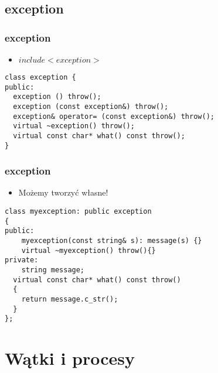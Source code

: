 \documentclass[10pt]{beamer}
\begin{document}
\subsection{exception}

\begin{frame}[fragile]
  \frametitle{exception}
  
\begin{itemize}
	\item $include <exception>$
\end{itemize}  
  
\begin{lstlisting}
class exception {
public:
  exception () throw();
  exception (const exception&) throw();
  exception& operator= (const exception&) throw();
  virtual ~exception() throw();
  virtual const char* what() const throw();
}
\end{lstlisting}
\end{frame}

\begin{frame}[fragile]
  \frametitle{exception}
\begin{itemize}
	\item Możemy tworzyć własne!
\end{itemize}  
  
\begin{lstlisting}
class myexception: public exception
{
public:
	myexception(const string& s): message(s) {}
	virtual ~myexception() throw(){}
private:
	string message;
  virtual const char* what() const throw()
  {
    return message.c_str();
  }
};
\end{lstlisting}

\end{frame}

\section{Wątki i procesy}
\end{document}

